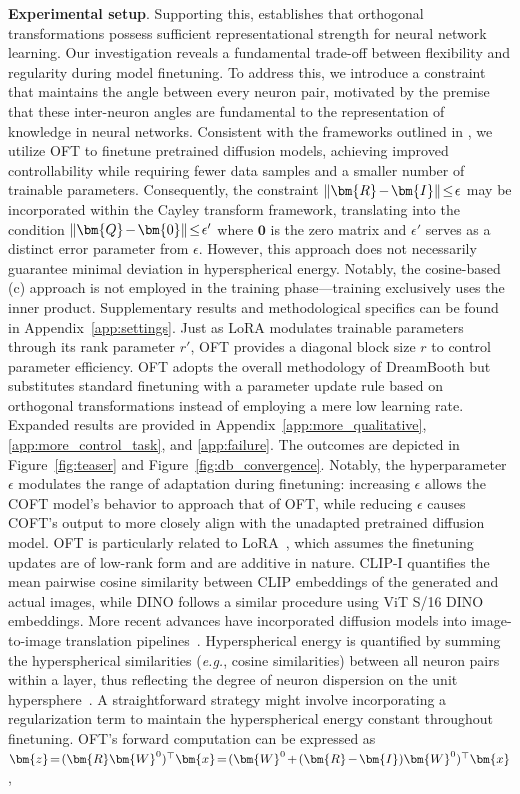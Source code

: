 \textbf{Experimental setup}. Supporting this, \cite{liu2021orthogonal} establishes that orthogonal transformations possess sufficient representational strength for neural network learning. Our investigation reveals a fundamental trade-off between flexibility and regularity during model finetuning. To address this, we introduce a constraint that maintains the angle between every neuron pair, motivated by the premise that these inter-neuron angles are fundamental to the representation of knowledge in neural networks. Consistent with the frameworks outlined in \cite{zhang2023adding,mou2023t2i}, we utilize OFT to finetune pretrained diffusion models, achieving improved controllability while requiring fewer data samples and a smaller number of trainable parameters. Consequently, the constraint $\thickmuskip=2mu \medmuskip=2mu\|\bm{R}-\bm{I}\|\leq\epsilon$ may be incorporated within the Cayley transform framework, translating into the condition $\thickmuskip=2mu \medmuskip=2mu \|\bm{Q}-\bm{0}\|\leq\epsilon'$ where $\bm{0}$ is the zero matrix and $\epsilon'$ serves as a distinct error parameter from $\epsilon$. However, this approach does not necessarily guarantee minimal deviation in hyperspherical energy. Notably, the cosine-based (c) approach is not employed in the training phase—training exclusively uses the inner product. Supplementary results and methodological specifics can be found in Appendix~\ref{app:settings}. Just as LoRA modulates trainable parameters through its rank parameter $r'$, OFT provides a diagonal block size $r$ to control parameter efficiency. OFT adopts the overall methodology of DreamBooth but substitutes standard finetuning with a parameter update rule based on orthogonal transformations instead of employing a mere low learning rate. Expanded results are provided in Appendix~\ref{app:more_qualitative}, \ref{app:more_control_task}, and \ref{app:failure}. The outcomes are depicted in Figure~\ref{fig:teaser} and Figure~\ref{fig:db_convergence}. Notably, the hyperparameter $\epsilon$ modulates the range of adaptation during finetuning: increasing $\epsilon$ allows the COFT model’s behavior to approach that of OFT, while reducing $\epsilon$ causes COFT's output to more closely align with the unadapted pretrained diffusion model. OFT is particularly related to LoRA~\cite{hulora2022}, which assumes the finetuning updates are of low-rank form and are additive in nature. CLIP-I quantifies the mean pairwise cosine similarity between CLIP embeddings of the generated and actual images, while DINO follows a similar procedure using ViT S/16 DINO embeddings. More recent advances have incorporated diffusion models into image-to-image translation pipelines~\cite{saharia2022palette,voynov2022sketch,wang2022pretraining}. Hyperspherical energy is quantified by summing the hyperspherical similarities (\emph{e.g.}, cosine similarities) between all neuron pairs within a layer, thus reflecting the degree of neuron dispersion on the unit hypersphere~\cite{liu2021learning}. A straightforward strategy might involve incorporating a regularization term to maintain the hyperspherical energy constant throughout finetuning. OFT's forward computation can be expressed as $\thickmuskip=2mu \medmuskip=2mu \bm{z}=(\bm{R}\bm{W}^0)^\top\bm{x}=(\bm{W}^0+(\bm{R}-\bm{I})\bm{W}^0)^\top\bm{x}$, 